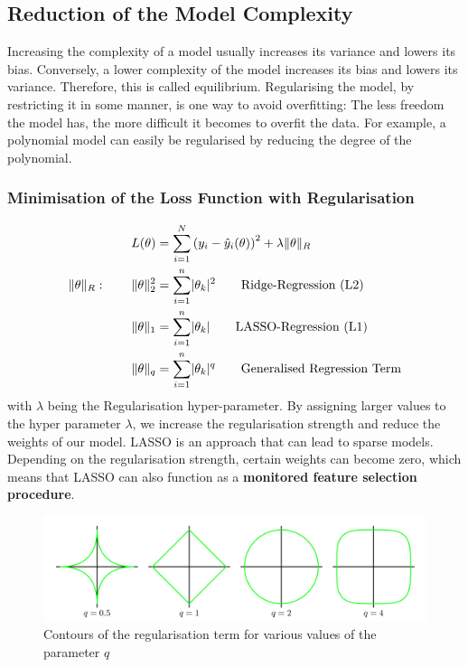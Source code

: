 \documentclass[11pt]{article}
\theoremstyle{definition}
\DeclarePairedDelimiter\abs{\lvert}{\rvert}
\DeclarePairedDelimiter\norm{\lVert}{\rVert}
\begin{document}
\subsection{Reduction of the Model Complexity}
Increasing the complexity of a model usually increases its variance and lowers its bias. Conversely, a lower complexity of the model increases its bias and lowers its variance. Therefore, this is called equilibrium. Regularising the model, by restricting it in some manner, is one way to avoid overfitting: The less freedom the model has, the more difficult it becomes to overfit the data. For example, a polynomial model can easily be regularised by reducing the degree of the polynomial.

\subsubsection{Minimisation of the Loss Function with Regularisation}
\begin{align*}
	L(\theta) &= \sum_{i=1}^{N} \left( y_i - \hat{y}_i(\theta) \right)^2 + \lambda \norm{\theta}_R\\
	\norm{\theta}_R:\qquad \norm{\theta}_2^2 &= \sum_{i=1}^{n} \abs{\theta_k}^2\qquad \text{Ridge-Regression (L2)}\\
	\norm{\theta}_1 &= \sum_{i=1}^{n} \abs{\theta_k}\qquad \text{LASSO-Regression (L1)}\\
	\norm{\theta}_q &= \sum_{i=1}^{n} \abs{\theta_k}^q\qquad \text{Generalised Regression Term}\\
\end{align*}
with $\lambda$ being the Regularisation hyper-parameter. By assigning larger values to the hyper parameter $\lambda$, we increase the regularisation strength and reduce the weights of our model. LASSO is an approach that can lead to sparse models. Depending on the regularisation strength, certain weights can become zero, which means that LASSO can also function as a \textbf{monitored feature selection procedure}.

\begin{figure}[H]
	\centering
	\includegraphics[width=0.8\linewidth]{img/regularisation_term_shape}
	\caption{Contours of the regularisation term for various values of the parameter $q$ \parencite{bishop2006pattern}}
	\label{fig:regularisationtermshape}
\end{figure}
\end{document}
